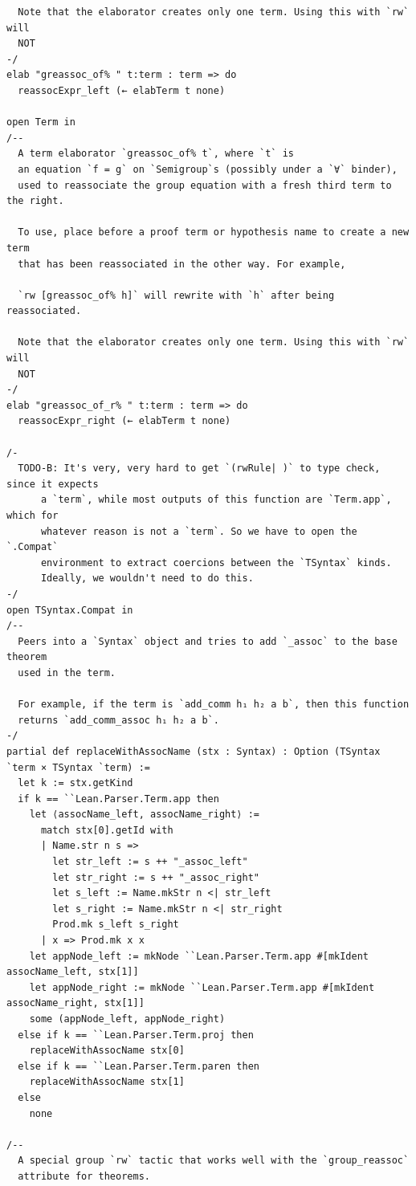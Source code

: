 \begin{Verbatim}
  Note that the elaborator creates only one term. Using this with `rw` will
  NOT
-/
elab "greassoc_of% " t:term : term => do
  reassocExpr_left (← elabTerm t none)

open Term in
/--
  A term elaborator `greassoc_of% t`, where `t` is
  an equation `f = g` on `Semigroup`s (possibly under a `∀` binder),
  used to reassociate the group equation with a fresh third term to the right.

  To use, place before a proof term or hypothesis name to create a new term
  that has been reassociated in the other way. For example,

  `rw [greassoc_of% h]` will rewrite with `h` after being reassociated.

  Note that the elaborator creates only one term. Using this with `rw` will
  NOT
-/
elab "greassoc_of_r% " t:term : term => do
  reassocExpr_right (← elabTerm t none)

/-
  TODO-B: It's very, very hard to get `(rwRule| )` to type check, since it expects
      a `term`, while most outputs of this function are `Term.app`, which for
      whatever reason is not a `term`. So we have to open the `.Compat`
      environment to extract coercions between the `TSyntax` kinds.
      Ideally, we wouldn't need to do this.
-/
open TSyntax.Compat in
/--
  Peers into a `Syntax` object and tries to add `_assoc` to the base theorem
  used in the term.

  For example, if the term is `add_comm h₁ h₂ a b`, then this function
  returns `add_comm_assoc h₁ h₂ a b`.
-/
partial def replaceWithAssocName (stx : Syntax) : Option (TSyntax `term × TSyntax `term) :=
  let k := stx.getKind
  if k == ``Lean.Parser.Term.app then
    let ⟨assocName_left, assocName_right⟩ :=
      match stx[0].getId with
      | Name.str n s =>
        let str_left := s ++ "_assoc_left"
        let str_right := s ++ "_assoc_right"
        let s_left := Name.mkStr n <| str_left
        let s_right := Name.mkStr n <| str_right
        Prod.mk s_left s_right
      | x => Prod.mk x x
    let appNode_left := mkNode ``Lean.Parser.Term.app #[mkIdent assocName_left, stx[1]]
    let appNode_right := mkNode ``Lean.Parser.Term.app #[mkIdent assocName_right, stx[1]]
    some (appNode_left, appNode_right)
  else if k == ``Lean.Parser.Term.proj then
    replaceWithAssocName stx[0]
  else if k == ``Lean.Parser.Term.paren then
    replaceWithAssocName stx[1]
  else
    none

/--
  A special group `rw` tactic that works well with the `group_reassoc`
  attribute for theorems.


\end{Verbatim}

